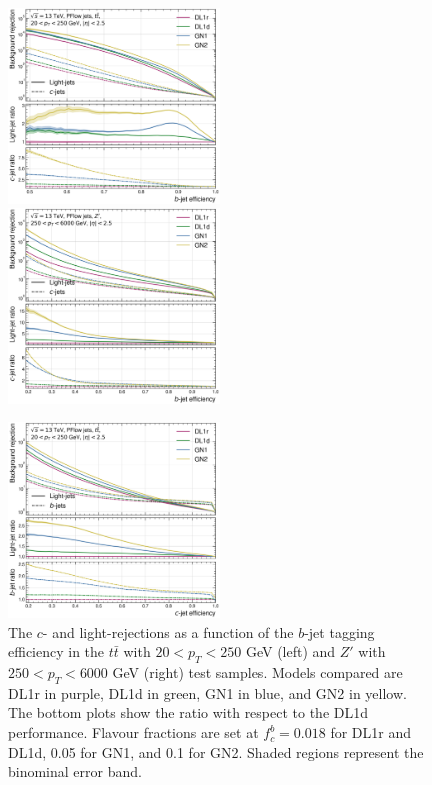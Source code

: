 \begin{center}
  \vspace{-1.cm}
  \begin{figure}[h!]
  \centerline{
  \includegraphics[width=0.50\textwidth]{Images/FTAG/GN/GN2/rocs/roc_ttbar.png}
  \includegraphics[width=0.50\textwidth]{Images/FTAG/GN/GN2/rocs/roc_zp.png}
  }
  \caption{The $c$- and light-rejections as a function of the $b$-jet tagging efficiency in the $t\bar{t}$ with $20 < p_T < 250$ GeV (left) and $Z'$ with $250 < p_T < 6000$ GeV (right) test samples. Models compared are DL1r in purple, DL1d in green, GN1 in blue, and GN2 in yellow. The bottom plots show the ratio with respect to the DL1d performance. Flavour fractions are set at $f^b_c = 0.018$ for DL1r and DL1d, 0.05 for GN1, and 0.1 for GN2. Shaded regions represent the binominal error band.}
  \label{fig:GN2rocb}
  \bigskip
  \centerline{
  \includegraphics[width=0.50\textwidth]{Images/FTAG/GN/GN2/rocs/roc_ttbar_c.png}
}
\end{figure}
\end{center}
